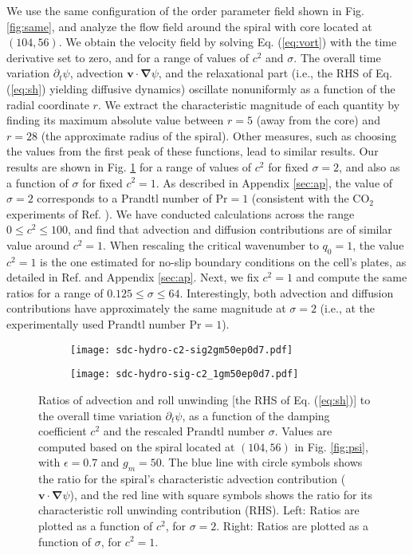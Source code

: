 \documentclass[preprint,prx,floatfix]{revtex4-1}
\begin{document}
We use the same configuration of the order parameter field shown in Fig. \ref{fig:same}, and analyze the flow field around the spiral with core located at $(104,56)$. We obtain the velocity field by solving Eq. (\ref{eq:vort}) with the time derivative set to zero, and for a range of values of $c^{2}$ and $\sigma$. The overall time variation $\partial_{t} \psi$, advection $\mathbf{v}\cdot\bm{\nabla}\psi$, and the relaxational part (i.e., the RHS of Eq. (\ref{eq:sh}) yielding diffusive dynamics) oscillate nonuniformly as a function of the radial coordinate $r$. We extract the characteristic magnitude of each quantity by finding its maximum absolute value between $r = 5$ (away from the core) and $r = 28$ (the approximate radius of the spiral). Other measures, such as choosing the values from the first peak of these functions, lead to similar results. Our results are shown in Fig. \ref{fig:hydro} for a range of values of $c^{2}$ for fixed $\sigma = 2$, and also as a function of $\sigma$ for fixed $c^{2} = 1$. As described in Appendix \ref{sec:ap}, the value of $\sigma = 2$ corresponds to a Prandtl number of $\text{Pr} = 1$ (consistent with the CO$_2$ experiments of Ref. \cite{morris1993spiral}). We have conducted calculations across the range $0 \leq c^2 \leq 100$, and find that advection and diffusion contributions are of similar value around $c^2 = 1$. When rescaling the critical wavenumber to $q_0 = 1$, the value $c^2 = 1$ is the one estimated for no-slip boundary conditions on the cell's plates, as detailed in Ref. \cite{manneville1984modelisation} and Appendix \ref{sec:ap}. Next, we fix $c^2 = 1$ and compute the same ratios for a range of $0.125 \leq \sigma \leq 64$. Interestingly, both advection and diffusion contributions have approximately the same magnitude at $\sigma = 2$ (i.e., at the experimentally used Prandtl number $\text{Pr} = 1$).

\begin{figure}[ht]
	\centering
    \begin{subfigure}[b]{0.45\textwidth}
    \texttt{[image: sdc-hydro-c2-sig2gm50ep0d7.pdf]}
    \end{subfigure}
    \begin{subfigure}[b]{0.45\textwidth}
    \texttt{[image: sdc-hydro-sig-c2\_1gm50ep0d7.pdf]}
    \end{subfigure}
    \caption{Ratios of advection and roll unwinding [the RHS of Eq. (\ref{eq:sh})] to the overall time variation $\partial_t\psi$, as a function of the damping coefficient $c^2$ and the rescaled Prandtl number $\sigma$. Values are computed based on the spiral located at $(104,56)$ in Fig. \ref{fig:psi}, with $\epsilon = 0.7$ and $g_m = 50$. The blue line with circle symbols shows the ratio for the spiral's characteristic advection contribution ($\mathbf{v}\cdot\bm{\nabla}\psi$), and the red line with square symbols shows the ratio for its characteristic roll unwinding contribution (RHS). Left: Ratios are plotted as a function of $c^2$, for $\sigma = 2$. Right: Ratios are plotted as a function of $\sigma$, for $c^{2} = 1$.
    }
	\label{fig:hydro}
\end{figure}
\end{document}
